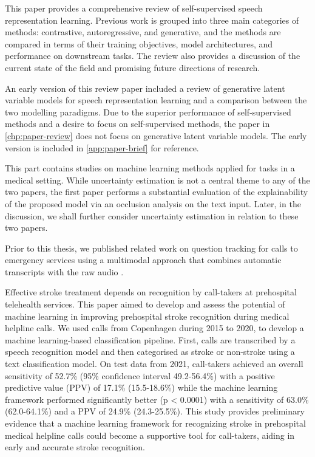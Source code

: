 This paper provides a comprehensive review of self-supervised speech representation learning. Previous work is grouped into three main categories of methods: contrastive, autoregressive, and generative, and the methods are compared in terms of their training objectives, model architectures, and performance on downstream tasks. The review also provides a discussion of the current state of the field and promising future directions of research. 

An early version of this review paper \cite{borgholt_brief_2022} included a review of generative latent variable models for speech representation learning and a comparison between the two modelling paradigms. Due to the superior performance of self-supervised methods and a desire to focus on self-supervised methods, the paper in \cref{chp:paper-review} does not focus on generative latent variable models. The early version is included in \cref{app:paper-brief} for reference.


 
This part contains studies on machine learning methods applied for tasks in a medical setting. While uncertainty estimation is not a central theme to any of the two papers, the first paper performs a substantial evaluation of the explainability of the proposed model via an occlusion analysis on the text input. Later, in the discussion, we shall further consider uncertainty estimation in relation to these two papers.

Prior to this thesis, we published related work on question tracking for calls to emergency services using a multimodal approach that combines automatic transcripts with the raw audio \cite{havtorn_multiqt_2020}. 


Effective stroke treatment depends on recognition by call-takers at prehospital telehealth services. This paper aimed to develop and assess the potential of machine learning in improving prehospital stroke recognition during medical helpline calls. 
We used calls from Copenhagen during 2015 to 2020, to develop a machine learning-based classification pipeline. First, calls are transcribed by a speech recognition model and then categorised as stroke or non-stroke using a text classification model.
On test data from 2021, call-takers achieved an overall sensitivity of 52.7\% (95\% confidence interval 49.2-56.4\%) with a positive predictive value (PPV) of 17.1\% (15.5-18.6\%) while the machine learning framework performed significantly better (p < 0.0001) with a sensitivity of 63.0\% (62.0-64.1\%) and a PPV of 24.9\% (24.3-25.5\%).
This study provides preliminary evidence that a machine learning framework for recognizing stroke in prehospital medical helpline calls could become a supportive tool for call-takers, aiding in early and accurate stroke recognition.



